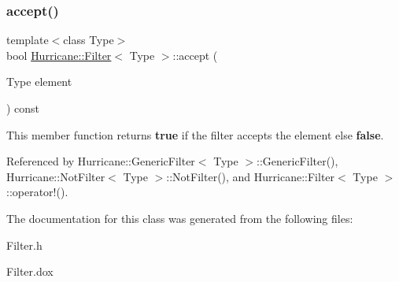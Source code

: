 \subsubsection{\texorpdfstring{accept()}{accept()}}
{\footnotesize\ttfamily template$<$class Type$>$ \\
bool \hyperlink{classHurricane_1_1Filter}{Hurricane\+::\+Filter}$<$ Type $>$\+::accept (\begin{DoxyParamCaption}\item[{Type}]{element }\end{DoxyParamCaption}) const\hspace{0.3cm}{\ttfamily [pure virtual]}}

This member function returns {\bfseries true} if the filter accepts the element else {\bfseries false}. 

Referenced by Hurricane\+::\+Generic\+Filter$<$ Type $>$\+::\+Generic\+Filter(), Hurricane\+::\+Not\+Filter$<$ Type $>$\+::\+Not\+Filter(), and Hurricane\+::\+Filter$<$ Type $>$\+::operator!().



The documentation for this class was generated from the following files\+:\begin{DoxyCompactItemize}
\item 
Filter.\+h\item 
Filter.\+dox\end{DoxyCompactItemize}

